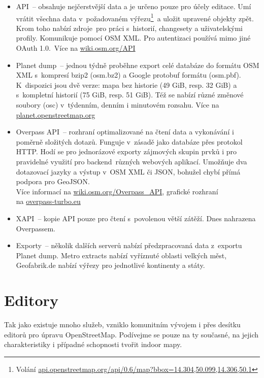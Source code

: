 \begin{itemize}

\item
  API~-- obsahuje nejčerstvější data a je určeno pouze pro účely editace. Umí vrátit všechna data v~požadovaném výřezu\footnote{Volání \href{http://api.openstreetmap.org/api/0.6/map?bbox=14.304,50.099,14.306,50.1}{api.openstreetmap.org/api/0.6/map?bbox=14.304,50.099,14.306,50.1}}~a uložit upravené objekty zpět. Krom toho nabízí zdroje~pro práci s~historií, changesety a uživatelskými profily. Komunikuje pomocí OSM XML. Pro autentizaci používá mimo jiné OAuth 1.0.~Více na \href{http://wiki.osm.org/API}{wiki.osm.org/API}
\item
  Planet dump~-- jednou týdně proběhne export celé databáze do formátu OSM XML s~kompresí bzip2 (osm.bz2) a Google protobuf formátu (osm.pbf). K~dispozici jsou dvě verze: mapa bez historie (49 GiB, resp. 32 GiB) a s~kompletní historií (75 GiB, resp. 51 GiB). Též se nabízí různé změnové soubory (osc) v~týdenním, denním i minutovém rozsahu. Více na \href{http://planet.openstreetmap.org}{planet.openstreetmap.org}
\item
  Overpass API~-- rozhraní optimalizované na čtení data a vykonávání i poměrně složitých dotazů. Funguje v~zásadě jako databáze přes protokol HTTP. Hodí se pro jednorázové exporty zájmových skupin prvků i pro pravidelné využití pro backend~různých webových aplikací. Umožňuje dva dotazovací jazyky a výstup v~OSM XML či JSON, bohužel chybí přímá podpora pro GeoJSON.\\
  Více informací na \href{http://wiki.osm.org/Overpass\_API}{wiki.osm.org/Overpass\_API}, grafické rozhraní \\ na \href{http://overpass-turbo.eu}{overpass-turbo.eu}
\item
  XAPI~-- kopie API pouze pro čtení s~povolenou větší zátěží. Dnes nahrazena Overpassem.
\item
  Exporty~-- několik dalších serverů nabízí předzpracovaná data z~exportu Planet dump. Metro extracts nabízí vyříznuté oblasti velkých měst\cite{zdroj42}, Geofabrik.de nabízí výřezy pro jednotlivé kontinenty a státy\cite{zdroj43}.
\end{itemize}

\section{Editory}\label{editory}

Tak jako existuje mnoho služeb, vzniklo komunitním vývojem i přes desítku editorů pro úpravu OpenStreetMap. Podívejme se pouze na ty současné, na jejich charakteristiky i případné schopnosti tvořit indoor mapy.

